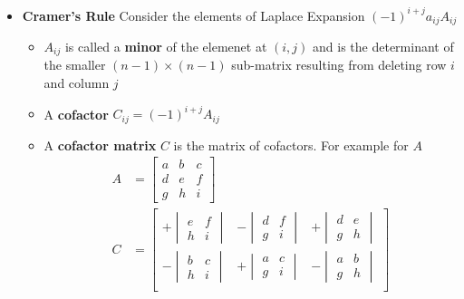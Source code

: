 \begin{itemize}
  \item \textbf{Cramer's Rule} Consider the elements of Laplace Expansion $(-1)^{i + j} a_{ij} A_{ij}$
    \begin{itemize}
      \item $A_{ij}$ is called a \textbf{minor} of the elemenet at $(i, j)$ and is the determinant of the smaller $(n - 1) \times (n - 1)$ sub-matrix resulting from deleting row $i$ and column $j$
      \item A \textbf{cofactor} $C_{ij} = (-1)^{i + j} A_{ij}$
      \item A \textbf{cofactor matrix} $C$ is the matrix of cofactors. For example for $A$
        \begin{align*}
          A &=
          \begin{bmatrix}
            a & b & c\\
            d & e & f\\
            g & h & i
          \end{bmatrix}\\
          C &=
          \begin{bmatrix}
            + \begin{vmatrix}
              e & f\\
              h & i
            \end{vmatrix}
          &- \begin{vmatrix}
            d & f\\
            g & i
          \end{vmatrix}
          &
          + \begin{vmatrix}
            d & e\\
            g & h
          \end{vmatrix}\\
          - \begin{vmatrix}
            b & c\\
            h & i
          \end{vmatrix}
          &
          + \begin{vmatrix}
            a & c\\
            g & i
          \end{vmatrix}
          &
          - \begin{vmatrix}
            a & b\\
            g & h
          \end{vmatrix}\\

\end{bmatrix}
\end{align*}
\end{itemize}
\end{itemize}
